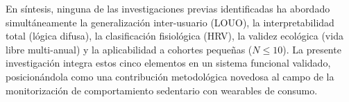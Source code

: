 En síntesis, ninguna de las investigaciones previas identificadas ha abordado simultáneamente la generalización inter-usuario (LOUO), la interpretabilidad total (lógica difusa), la clasificación fisiológica (HRV), la validez ecológica (vida libre multi-anual) y la aplicabilidad a cohortes pequeñas ($N \leq 10$). La presente investigación integra estos cinco elementos en un sistema funcional validado, posicionándola como una contribución metodológica novedosa al campo de la monitorización de comportamiento sedentario con wearables de consumo.
